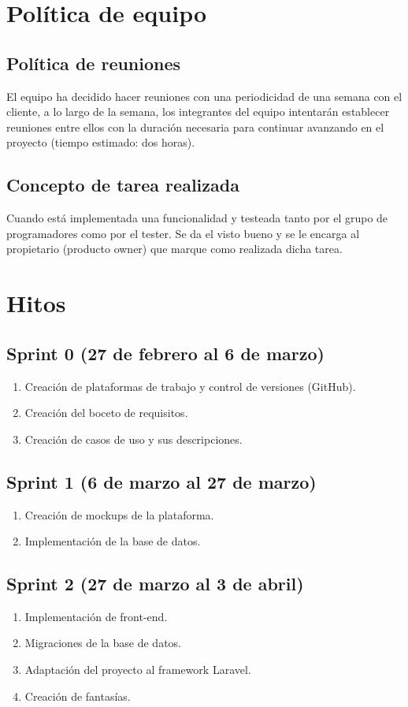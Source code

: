 \documentclass[12pt,letterpaper]{article}
\begin{document}
\section{Política de equipo}
\subsection{Política de reuniones}
El equipo ha decidido hacer reuniones con una periodicidad de una semana con el cliente, a lo largo de la semana, los integrantes del equipo intentarán establecer reuniones entre ellos con la duración necesaria para continuar avanzando en el proyecto (tiempo estimado: dos horas).

\subsection{Concepto de tarea realizada}
Cuando está implementada una funcionalidad y testeada tanto por el grupo de programadores como por el tester. Se da el visto bueno y se le encarga al propietario (producto owner) que marque como realizada dicha tarea.

\section{Hitos} %
\subsection{Sprint 0 (27 de febrero al 6 de marzo)}
\begin{enumerate}
	\item Creación de plataformas de trabajo y control de versiones (GitHub).
	\item Creación del boceto de requisitos.
	\item Creación de casos de uso y sus descripciones.
\end{enumerate}
\subsection{Sprint 1 (6 de marzo al 27 de marzo)}
\begin{enumerate}
	\item Creación de mockups de la plataforma.
	\item Implementación de la base de datos.
\end{enumerate}

\subsection{Sprint 2 (27 de marzo al 3 de abril)}
\begin{enumerate}
	\item Implementación de front-end.
	\item Migraciones de la base de datos.
	\item Adaptación del proyecto al framework Laravel.
	\item Creación de fantasías.
\end{enumerate}
\end{document}
